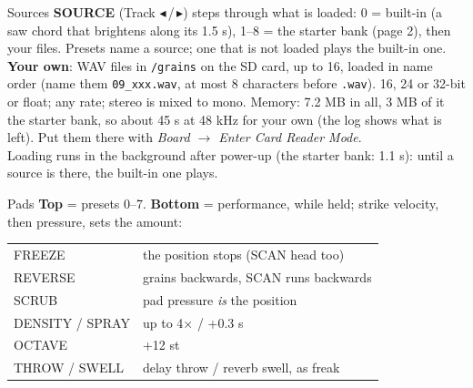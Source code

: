 \documentclass{article}
\newcommand{\FX}[1]{\textcolor{fxc}{#1}}
\newcommand{\GR}[1]{\textcolor{grc}{#1}}
\begin{document}
\begin{minipage}[t]{66mm}\vspace{0pt}
\begin{card}{Sources}
\textbf{SOURCE} (Track \(\blacktriangleleft\)\,/\,\(\blacktriangleright\)) steps through what is loaded: 0 = built-in
(a saw chord that brightens along its 1.5 s), 1--8 = the starter bank (page 2), then your files.
Presets name a source; one that is not loaded plays the built-in one.\\[0.4mm]
\textbf{Your own}: WAV files in \texttt{/grains} on the SD card, up to 16, loaded in name order
(name them \texttt{09\_xxx.wav}, at most 8 characters before \texttt{.wav}). 16, 24 or 32-bit or float;
any rate; stereo is mixed to mono. Memory: 7.2 MB in all, 3 MB of it the starter bank, so about
45 s at 48 kHz for your own (the log shows what is left).
Put them there with \emph{Board \(\to\) Enter Card Reader Mode}.\\[0.4mm]
Loading runs in the background after power-up (the starter bank: 1.1 s): until a source is
there, the built-in one plays.
\end{card}
\begin{card}{Pads}
\textbf{Top} = presets 0--7. \textbf{Bottom} = performance, while held; strike velocity, then
pressure, sets the amount:
\fontsize{6.6}{7.9}\selectfont
\begin{tabularx}{\linewidth}{@{}l L@{}}
\GR{FREEZE} & the position stops (SCAN head too) \\
\GR{REVERSE} & grains backwards, SCAN runs backwards \\
\GR{SCRUB} & pad pressure \emph{is} the position \\
\GR{DENSITY / SPRAY} & up to 4\(\times\) / +0.3 s \\
OCTAVE & +12 st \\
\FX{THROW / SWELL} & delay throw / reverb swell, as freak \\
\end{tabularx}
\end{card}
\end{minipage}\hfill
\end{document}
